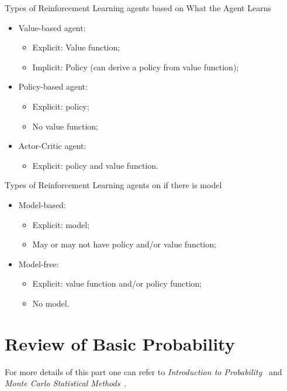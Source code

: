 \documentclass{progartcn}
\begin{document}
	Types of Reinforcement Learning agents based on What the Agent Learns
	\begin{itemize}[noitemsep,topsep=0pt]
		\item Value-based agent:
		\begin{itemize}[noitemsep,topsep=0pt]
			\item Explicit: Value function;
			\item Implicit: Policy (can derive a policy from value function);
		\end{itemize}
		\item Policy-based agent: 
		\begin{itemize}[noitemsep,topsep=0pt]
			\item Explicit: policy;
			\item No value function;
		\end{itemize}
		\item Actor-Critic agent:
		\begin{itemize}[noitemsep,topsep=0pt]
			\item Explicit: policy and value function.\\
		\end{itemize}
	\end{itemize}

	Types of Reinforcement Learning agents on if there is model
	\begin{itemize}[noitemsep,topsep=0pt]
		\item Model-based:
		\begin{itemize}[noitemsep,topsep=0pt]
			\item Explicit: model;
			\item May or may not have policy and/or value function;
		\end{itemize}
		\item Model-free: 
		\begin{itemize}[noitemsep,topsep=0pt]
			\item Explicit: value function and/or policy function;
			\item No model.
		\end{itemize}
	\end{itemize}

\pagebreak

\section{Review of Basic Probability}

	For more details of this part one can refer to \textit{Introduction to Probability}~\cite{HB} and \textit{Monte Carlo Statistical Methods}~\cite{robert2013monte}.\\
\end{document}
